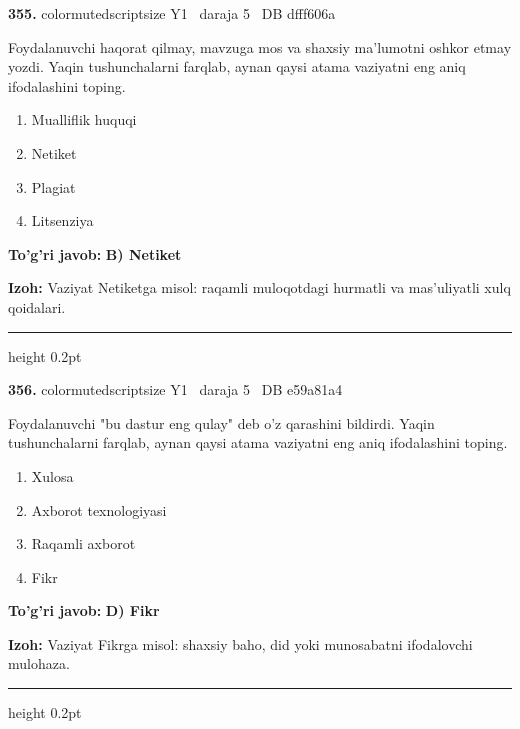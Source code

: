 \documentclass[10pt,a4paper,oneside]{article}
\begin{document}
\noindent\textbf{\color{ink}355.}  {color{muted}scriptsize Y1 \textbullet\ daraja 5 \textbullet\ DB dfff606a}
\par
Foydalanuvchi haqorat qilmay, mavzuga mos va shaxsiy ma'lumotni oshkor etmay yozdi. Yaqin tushunchalarni farqlab, aynan qaysi atama vaziyatni eng aniq ifodalashini toping.
\begin{enumerate}[label=\Alph*),leftmargin=9mm]
\item Mualliflik huquqi
\item Netiket
\item Plagiat
\item Litsenziya
\end{enumerate}
\begin{tcolorbox}[enhanced,breakable,colback=teal!4,colframe=teal!50!black,boxrule=0.5pt,arc=1.1mm,left=3mm,right=3mm,top=1.7mm,bottom=1.7mm,before skip=2mm,after skip=2mm]
\textbf{\color{teal}To'g'ri javob:} \textbf{B) Netiket}
\par\smallskip
\textbf{Izoh:} Vaziyat Netiketga misol: raqamli muloqotdagi hurmatli va mas'uliyatli xulq qoidalari.
\end{tcolorbox}
\vspace{2mm}\hrule height 0.2pt \vspace{3mm}

\noindent\textbf{\color{ink}356.}  {color{muted}scriptsize Y1 \textbullet\ daraja 5 \textbullet\ DB e59a81a4}
\par
Foydalanuvchi "bu dastur eng qulay" deb o'z qarashini bildirdi. Yaqin tushunchalarni farqlab, aynan qaysi atama vaziyatni eng aniq ifodalashini toping.
\begin{enumerate}[label=\Alph*),leftmargin=9mm]
\item Xulosa
\item Axborot texnologiyasi
\item Raqamli axborot
\item Fikr
\end{enumerate}
\begin{tcolorbox}[enhanced,breakable,colback=teal!4,colframe=teal!50!black,boxrule=0.5pt,arc=1.1mm,left=3mm,right=3mm,top=1.7mm,bottom=1.7mm,before skip=2mm,after skip=2mm]
\textbf{\color{teal}To'g'ri javob:} \textbf{D) Fikr}
\par\smallskip
\textbf{Izoh:} Vaziyat Fikrga misol: shaxsiy baho, did yoki munosabatni ifodalovchi mulohaza.
\end{tcolorbox}
\vspace{2mm}\hrule height 0.2pt \vspace{3mm}
\end{document}

